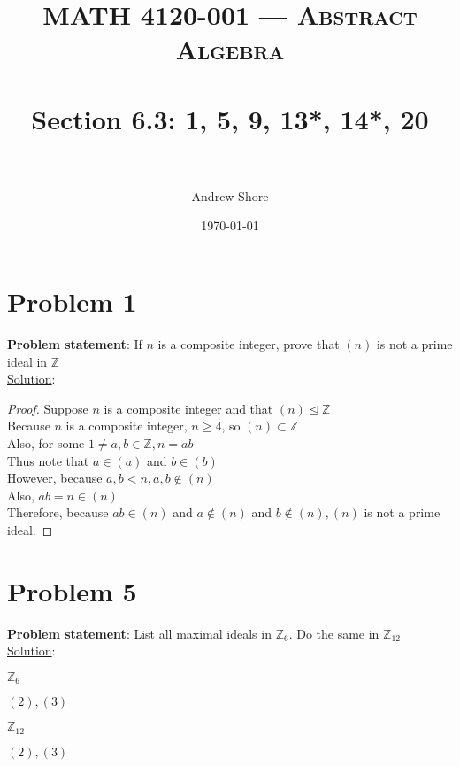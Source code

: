 \documentclass{article} %
\title{ 
\normalfont \normalsize 
\textsc{MATH 4120-001 --- Abstract Algebra} \\
\horrule{0.5pt} \\[0cm] %
\huge Section 6.3: 1, 5, 9, 13*, 14*, 20 \\ %
\horrule{2pt} \\[0cm] %
}
\author{Andrew Shore} %
\date{\normalsize\today} %
\begin{document}
\maketitle %

\section*{Problem 1}


\textbf{Problem statement}: If $n$ is a composite integer, prove that $(n)$ is not a prime ideal in $\mathbb{Z}$
\\

\underline{Solution}: 
\begin{addmargin}[1em]{0em}
\begin{proof}
Suppose $n$ is a composite integer and that $(n) \unlhd \mathbb{Z}$
\\Because $n$ is a composite integer, $n \geq 4$, so $(n) \subset \mathbb{Z}$
\\Also, for some $1 \neq a, b \in \mathbb{Z}, n = ab$
\\Thus note that $a \in (a)$ and $b \in (b)$
\\However, because $a, b < n, a, b \not\in (n)$
\\Also, $ab = n \in (n)$
\\Therefore, because $ab \in (n)$ and $a \not\in (n)$ and $b \not\in (n), (n)$ is not a prime ideal.
\end{proof}
\end{addmargin}    

\newpage

\section*{Problem 5}

\textbf{Problem statement}: List all maximal ideals in $\mathbb{Z}_6$.  Do the same in $\mathbb{Z}_{12}$
\\

\underline{Solution}: 
\begin{addmargin}[1em]{0em}
\textbf{$\mathbb{Z}_{6}$}
\begin{addmargin}[1em]{0em}
$(2),(3)$
\end{addmargin}
\textbf{$\mathbb{Z}_{12}$}
\begin{addmargin}[1em]{0em}
$(2),(3)$
\end{addmargin}
\end{addmargin}
\end{document}
